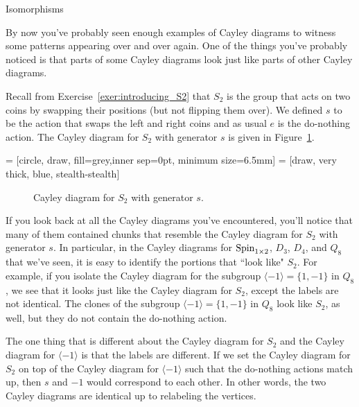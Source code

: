\begin{section}{Isomorphisms}

By now you've probably seen enough examples of Cayley diagrams to witness some patterns appearing over and over again.    One of the things you've probably noticed is that parts of some Cayley diagrams look just like parts of other Cayley diagrams.

Recall from Exercise~\ref{exer:introducing_S2} that $S_2$ is the group that acts on two coins by swapping their positions (but not flipping them over).  We defined $s$ to be the action that swaps the left and right coins and as usual $e$ is the do-nothing action.  The Cayley diagram for $S_2$ with generator $s$ is given in Figure~\ref{fig:S2}. 

 = [circle, draw, fill=grey,inner sep=0pt, minimum size=6.5mm]
 = [draw, very thick, blue, stealth-stealth]

\begin{figure}
\centering
{}
\caption{Cayley diagram for $S_2$ with generator $s$.}\label{fig:S2}
\end{figure}

If you look back at all the Cayley diagrams you've encountered, you'll notice that many of them contained chunks that resemble the Cayley diagram for $S_2$ with generator $s$.  In particular, in the Cayley diagrams for $\operatorname{Spin}_{1\times 2}$, $D_3$, $D_4$, and $Q_8$ that we've seen, it is easy to identify the portions that ``look like" $S_2$.  For example, if you isolate the Cayley diagram for the subgroup $\langle -1\rangle=\{1,-1\}$ in $Q_8$, we see that it looks just like the Cayley diagram for $S_2$, except the labels are not identical.  The clones of the subgroup $\langle -1\rangle=\{1,-1\}$ in $Q_8$ look like $S_2$, as well, but they do not contain the do-nothing action.  

The one thing that is different about the Cayley diagram for $S_2$ and the Cayley diagram for $\langle -1\rangle$ is that the labels are different.  If we set the Cayley diagram for $S_2$ on top of the Cayley diagram for $\langle -1\rangle$ such that the do-nothing actions match up, then $s$ and $-1$ would correspond to each other.  In other words, the two Cayley diagrams are identical up to relabeling the vertices.


\end{section}

